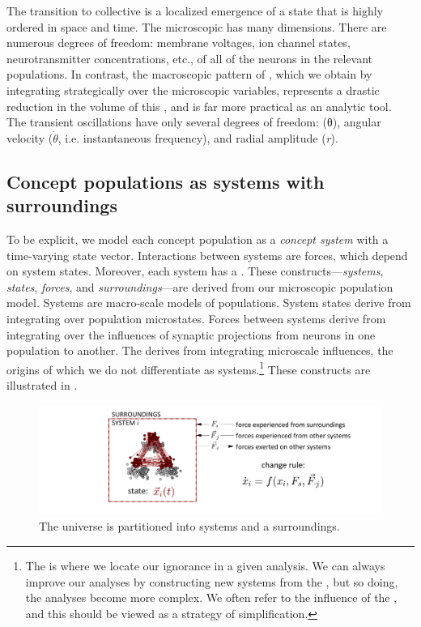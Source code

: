   The transition to collective  is a localized emergence of a state that is highly ordered in space and time. The microscopic  has many dimensions. There are numerous degrees of freedom: membrane voltages, ion channel states, neurotransmitter concentrations, etc., of all of the neurons in the relevant populations. In contrast, the macroscopic pattern of , which we obtain by integrating strategically over the microscopic variables, represents a drastic reduction in the volume of this , and is far more practical as an analytic tool. The transient oscillations have only several degrees of freedom:  (θ), angular velocity ($\dot{\theta}$, i.e. instantaneous frequency), and radial amplitude (\textit{r}).

\subsection{Concept populations as systems with surroundings} 

To be explicit, we model each concept population as a \textit{concept system} with a time-varying state vector. Interactions between systems are forces, which depend on system states. Moreover, each system has a . These constructs—\textit{systems}, \textit{states}, \textit{forces}, and \textit{surroundings}—are derived from our microscopic population model. Systems are macro-scale models of populations. System states derive from integrating over population microstates. Forces between systems derive from integrating over the influences of synaptic projections from neurons in one population to another. The  derives from integrating microscale influences, the origins of which we do not differentiate as systems.\footnote{The  is where we locate our ignorance in a given analysis. We can always improve our analyses by constructing new systems from the , but so doing, the analyses become more complex. We often refer to the influence of the , and this should be viewed as a strategy of simplification.} These constructs are illustrated in {}.

  
\begin{figure}
\includegraphics[width=\textwidth]{figures/Tilsen-img11.png}
\caption{The universe is partitioned into systems and a surroundings.}
\label{fig:2:4}
\end{figure}
 

